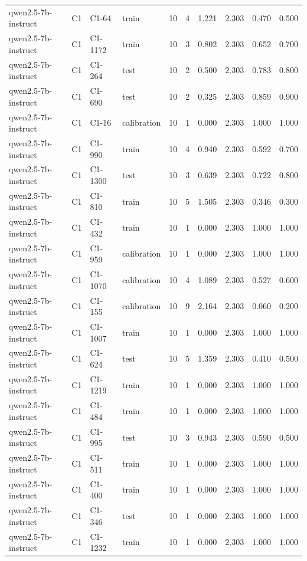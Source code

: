 \begin{table}
\begin{tabular}{llllrrrrrr}
qwen2.5-7b-instruct & C1 & C1-64 & train & 10 & 4 & 1.221 & 2.303 & 0.470 & 0.500 \\
qwen2.5-7b-instruct & C1 & C1-1172 & train & 10 & 3 & 0.802 & 2.303 & 0.652 & 0.700 \\
qwen2.5-7b-instruct & C1 & C1-264 & test & 10 & 2 & 0.500 & 2.303 & 0.783 & 0.800 \\
qwen2.5-7b-instruct & C1 & C1-690 & test & 10 & 2 & 0.325 & 2.303 & 0.859 & 0.900 \\
qwen2.5-7b-instruct & C1 & C1-16 & calibration & 10 & 1 & 0.000 & 2.303 & 1.000 & 1.000 \\
qwen2.5-7b-instruct & C1 & C1-990 & train & 10 & 4 & 0.940 & 2.303 & 0.592 & 0.700 \\
qwen2.5-7b-instruct & C1 & C1-1300 & test & 10 & 3 & 0.639 & 2.303 & 0.722 & 0.800 \\
qwen2.5-7b-instruct & C1 & C1-810 & train & 10 & 5 & 1.505 & 2.303 & 0.346 & 0.300 \\
qwen2.5-7b-instruct & C1 & C1-432 & train & 10 & 1 & 0.000 & 2.303 & 1.000 & 1.000 \\
qwen2.5-7b-instruct & C1 & C1-959 & calibration & 10 & 1 & 0.000 & 2.303 & 1.000 & 1.000 \\
qwen2.5-7b-instruct & C1 & C1-1070 & calibration & 10 & 4 & 1.089 & 2.303 & 0.527 & 0.600 \\
qwen2.5-7b-instruct & C1 & C1-155 & calibration & 10 & 9 & 2.164 & 2.303 & 0.060 & 0.200 \\
qwen2.5-7b-instruct & C1 & C1-1007 & train & 10 & 1 & 0.000 & 2.303 & 1.000 & 1.000 \\
qwen2.5-7b-instruct & C1 & C1-624 & test & 10 & 5 & 1.359 & 2.303 & 0.410 & 0.500 \\
qwen2.5-7b-instruct & C1 & C1-1219 & train & 10 & 1 & 0.000 & 2.303 & 1.000 & 1.000 \\
qwen2.5-7b-instruct & C1 & C1-484 & train & 10 & 1 & 0.000 & 2.303 & 1.000 & 1.000 \\
qwen2.5-7b-instruct & C1 & C1-995 & test & 10 & 3 & 0.943 & 2.303 & 0.590 & 0.500 \\
qwen2.5-7b-instruct & C1 & C1-511 & train & 10 & 1 & 0.000 & 2.303 & 1.000 & 1.000 \\
qwen2.5-7b-instruct & C1 & C1-400 & train & 10 & 1 & 0.000 & 2.303 & 1.000 & 1.000 \\
qwen2.5-7b-instruct & C1 & C1-346 & test & 10 & 1 & 0.000 & 2.303 & 1.000 & 1.000 \\
qwen2.5-7b-instruct & C1 & C1-1232 & train & 10 & 1 & 0.000 & 2.303 & 1.000 & 1.000 \\

\end{tabular}
\end{table}
